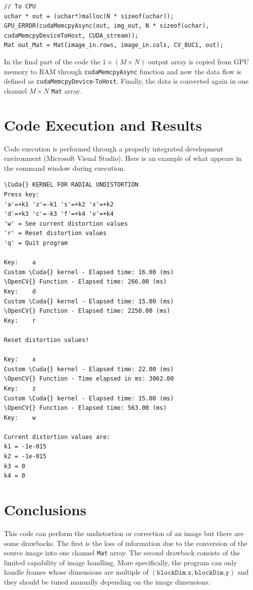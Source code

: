 \documentclass[12pt]{article}
\newcommand*{\Cuda}{\textsc{CUDA}}
\newcommand*{\OpenCV}{\textsc{OpenCV}}
\begin{document}
\begin{lstlisting}
// To CPU
uchar * out = (uchar*)malloc(N * sizeof(uchar));
GPU_ERROR(cudaMemcpyAsync(out, img_out, N * sizeof(uchar), cudaMemcpyDeviceToHost, CUDA_stream));
Mat out_Mat = Mat(image_in.rows, image_in.cols, CV_8UC1, out);
\end{lstlisting}
%
In the final part of the code the $1 \times (M\times N)$ output array is copied from GPU memory to RAM through \texttt{cudaMemcpyAsync} function and now the data flow is defined as \texttt{cudaMemcpyDevice}-\texttt{ToHost}. Finally, the data is converted again in one channel $M\times N$ \texttt{Mat} array.
%
\section{Code Execution and Results}
%
Code execution is performed through a properly integrated development environment (Microsoft Visual Studio). Here is an example of what appears in the command window during execution.
%
\begin{lstlisting}[style=DOS]
\Cuda{} KERNEL FOR RADIAL UNDISTORTION
Press key:
'a'=+k1 'z'=-k1 's'=+k2 'x'=+k2
'd'=+k3 'c'=-k3 'f'=+k4 'v'=+k4
'w' = See current distortion values
'r' = Reset distortion values
'q' = Quit program

Key:    a
Custom \Cuda{} kernel - Elapsed time: 16.00 (ms)
\OpenCV{} Function - Elapsed time: 266.00 (ms)
Key:    d
Custom \Cuda{} kernel - Elapsed time: 15.00 (ms)
\OpenCV{} Function - Elapsed time: 2250.00 (ms)
Key:    r

Reset distortion values!

Key:    x
Custom \Cuda{} kernel - Elapsed time: 22.00 (ms)
\OpenCV{} Function - Time elapsed in ms: 3062.00
Key:    z
Custom \Cuda{} kernel - Elapsed time: 15.00 (ms)
\OpenCV{} Function - Elapsed time: 563.00 (ms)
Key:    w

Current distortion values are:
k1 = -1e-015
k2 = -1e-015
k3 = 0
k4 = 0
\end{lstlisting}
%
\section{Conclusions}
%
This code can perform the undistortion or correction of an image but there are some drawbacks. The first is the loss of information due to the conversion of the source image into one channel \texttt{Mat} array. The second drawback consists of the limited capability of image handling. More specifically, the program can only handle frames whose dimensions are multiple of $(\texttt{blockDim.x},\texttt{blockDim.y})$ and they should be tuned manually depending on the image dimensions.
\end{document}
